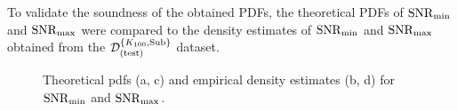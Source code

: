 To validate the soundness of the obtained PDFs, the theoretical PDFs of \( \mathrm{SNR}_{\min} \) and \( \mathrm{SNR}_{\max} \) were compared to
the density estimates of \( \mathrm{SNR}_{\min} \) and \( \mathrm{SNR}_{\max} \) obtained from the \( \mathcal{D}^{\{K_{100},\text{Sub}\}}_{(\text{test})} \) dataset.
\begin{figure}[H]
    \centering
    \newline
    \caption{Theoretical \glspl{pdf} (a, c) and empirical density estimates (b, d) for \( \mathrm{SNR}_{\min} \) and  \( \mathrm{SNR}_{\max} \).}
    \label{fig:snr_pdf}
\end{figure}

